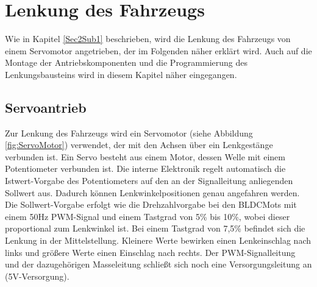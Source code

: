 

\pagestyle{fancy}
\rhead{\thepage} \chead{} 
\cfoot{}

\section{Lenkung des Fahrzeugs}\label{Sec5}

Wie in Kapitel \ref{Sec2Sub1} beschrieben, wird die Lenkung des Fahrzeugs von einem Servomotor angetrieben, der im Folgenden näher erklärt wird. Auch auf die Montage der Antriebskomponenten und die Programmierung des Lenkungsbausteins wird in diesem Kapitel näher eingegangen.

\subsection{Servoantrieb}\label{Sec5Sub1}

Zur Lenkung des Fahrzeugs wird ein Servomotor (siehe Abbildung \ref{fig:ServoMotor}) verwendet, der mit den Achsen über ein Lenkgestänge verbunden ist. Ein Servo besteht aus einem Motor, dessen Welle mit einem Potentiometer verbunden ist. Die interne Elektronik regelt automatisch die Istwert-Vorgabe des Potentiometers auf den an der Signalleitung anliegenden Sollwert aus. Dadurch können Lenkwinkelpositionen genau angefahren werden. Die Sollwert-Vorgabe erfolgt wie die Drehzahlvorgabe bei den \acp{BLDCMot} mit einem 50Hz \ac{PWM}-Signal und einem Tastgrad von 5\% bis 10\%, wobei dieser proportional zum Lenkwinkel ist. Bei einem Tastgrad von 7,5\% befindet sich die Lenkung in der Mittelstellung. Kleinere Werte bewirken einen Lenkeinschlag nach links und größere Werte einen Einschlag nach rechts. Der \ac{PWM}-Signalleitung und der dazugehörigen Masseleitung schließt sich noch eine Versorgungsleitung an (5V-Versorgung).

